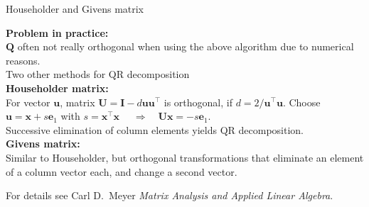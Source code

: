 \documentclass[11pt,compress,t,notes=noshow, xcolor=table]{beamer}
\begin{document}
\begin{vbframe}{Householder and Givens matrix}

\vspace*{-0.2cm}
\textbf{Problem in practice:}\\
$\mathbf{Q}$ often not really orthogonal when using the above algorithm due to numerical reasons.\\
\vspace*{0.2cm}
Two other methods for QR decomposition\\
\medskip
{\bf Householder matrix:}\\
\medskip
For vector $\mathbf{u}$, matrix $\mathbf{U} = \mathbf{I} - d\mathbf{uu}^\top$ is orthogonal,
if $d = 2/ \mathbf{u}^\top\mathbf{u}$.
Choose $\mathbf{u} = \mathbf{x} + s\mathbf{e}_1$ with $s = \mathbf{x}^\top\mathbf{x}$
$\quad \Rightarrow \quad \mathbf{Ux} = - s\mathbf{e}_1$.\\
\medskip
Successive elimination of column elements yields QR decomposition.\\
\medskip
{\bf Givens matrix:}\\
\medskip
Similar to Householder, but orthogonal transformations that eliminate an element of a column vector each, and change a second vector. \\
\medskip

\begin{footnotesize}
For details see Carl D.\ Meyer \emph{Matrix Analysis and Applied Linear Algebra}.
\end{footnotesize}

\end{vbframe}
\end{document}
